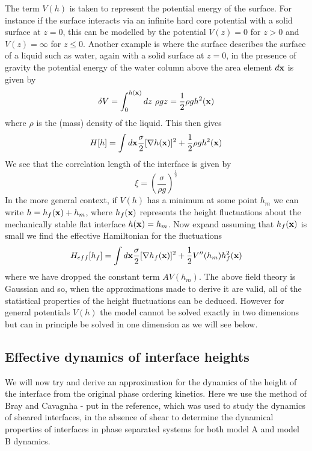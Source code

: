 The term $V(h)$ is taken to represent the potential energy of the surface. For instance if the surface interacts via an infinite hard core potential with a solid surface at $z=0$, this can be modelled by the potential $V(z) =0$ for $z \greater 0$ and $V(z)=\infty$ for $z\leq 0$. Another example is where the surface describes the surface of a liquid such as water, again with a solid surface at $z=0$, in the presence of gravity the potential energy of the water column above the area 
element $d{\bf x}$ is given by
\begin{equation}
    \delta V = \int_0^{h({\bf x})} dz\ \rho g z = \frac{1}{2}\rho g h^2({\bf x})
\end{equation}
where $\rho$ is the (mass) density of the liquid. This then gives
\begin{equation}
    H[h] = \int d{\bf x} \frac{\sigma}{2}[\nabla h({\bf x})]^2 + \frac{1}{2}\rho g h^2({\bf x})
\end{equation}
We see that the correlation length of the interface is given by
\begin{equation}
    \xi = \left(\frac{\sigma}{\rho g}\right)^{\frac{1}{2}}
\end{equation}
In the more general context, if $V(h)$ has a minimum at some point $h_m$ we can write $h= h_f({\bf x})+ h_m$, where  $h_f({\bf x})$ represents the height fluctuations about the mechanically stable flat interface $h({\bf x})=h_m$. Now expand assuming that $h_f({\bf x})$ is
small we find the effective Hamiltonian for the fluctuations
\begin{equation}
    H_{eff}[h_f] = \int d{\bf x} \frac{\sigma}{2}[\nabla h_f({\bf x})]^2 + \frac{1}{2}V''(h_m) h_f^2({\bf x})
\end{equation}
where we have dropped the constant term $AV(h_m)$. The above field theory is Gaussian and 
so, when the approximations made to derive it are valid, all of the statistical properties of the height fluctuations can be deduced. However for general potentials $V(h)$ the model cannot be solved exactly in two dimensions but can in principle be solved in one dimension as we will see below.

    \subsection{Effective dynamics of interface heights}\label{heightd}
We will now try and derive an approximation for the dynamics of the  height of the interface from the original phase ordering kinetics. Here we use the method of Bray and Cavagnha - put in the reference, which was used to study the dynamics of sheared interfaces, in the absence of shear to determine the dynamical properties of interfaces in phase separated systems for both model A and model B dynamics.

